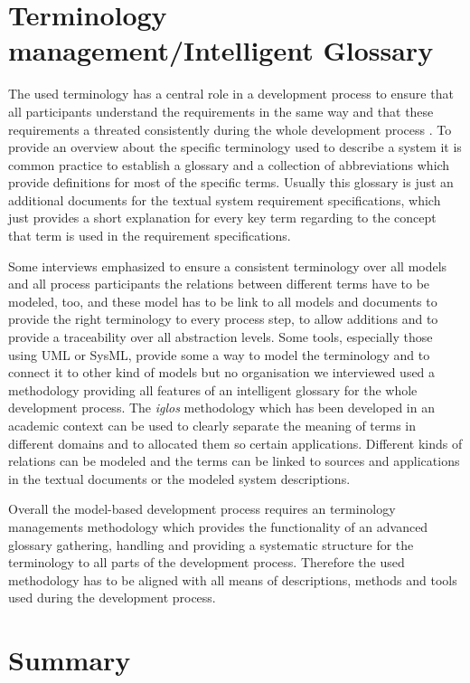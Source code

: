 \documentclass{./template/openetcs_report}
\begin{document}
\section{Terminology management/Intelligent Glossary}

The used terminology has a central role in a development process to ensure that all participants understand the requirements in the same way and that these requirements a threated consistently during the whole development process \citep{Schnieder.2010}. To provide an overview about the specific terminology used to describe a system it is common practice to establish a glossary and a collection of abbreviations which provide definitions for most of the specific terms. Usually this glossary is just an additional documents for the textual system requirement specifications, which just provides a short explanation for every key term regarding to the concept that term is used in the requirement specifications. 

Some interviews emphasized to ensure a consistent terminology over all models and all process participants the relations between different terms have to be modeled, too, and these model has to be link to all models and documents to provide the right terminology to every process step, to allow additions and to provide a traceability over all abstraction levels. Some tools, especially those using UML or SysML, provide some a way to model the terminology and to connect it to other kind of models but no organisation we interviewed used a methodology providing all features of an intelligent glossary for the whole development process. The \textit{iglos} methodology which has been developed in an academic context can be used to clearly separate the meaning of terms in different domains and to allocated them so certain applications. Different kinds of relations can be modeled and the terms can be linked to sources and applications in the textual documents or the modeled system descriptions.

Overall the model-based development process requires an terminology managements methodology which provides the functionality of an advanced glossary gathering, handling and providing a systematic structure for the terminology to all parts of the development process. Therefore the used methodology has to be aligned with all means of descriptions, methods and tools used during the development process. 

\section{Summary}
\end{document}
